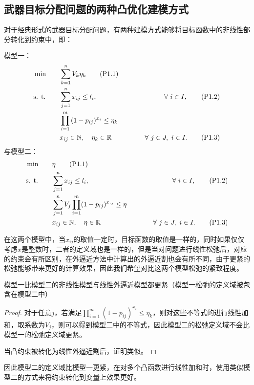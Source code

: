 \subsection{武器目标分配问题的两种凸优化建模方式}
对于经典形式的武器目标分配问题，有两种建模方式能够将目标函数中的非线性部分转化到约束中，即：

模型一：
\begin{alignat}{3}
    &\min\quad && \sum_{k=1}^n V_k \eta_k \tag{P1.1} \\ 
    &\text{s. t.}\quad &&\sum_{j=1}^n x_{ij} \leq l_i, \quad &\hspace{1cm}\forall ~ i \in I, \tag{P1.2}\\
    & &&  \prod_{i=1}^{m}{(1-p_{ij})^{x_{i}}} \leq \eta_k \\
    & && x_{ij} \in \mathbb{N},\quad \eta_k \in \mathbb{R} \quad &\hspace{1cm}\forall ~ j\in J, ~ i \in I. \tag{P1.3}
\end{alignat}
与模型二：
\begin{alignat}{3}
    &\min\quad && \eta \tag{P1.1} \\ 
    &\text{s. t.}\quad &&\sum_{j=1}^n x_{ij} \leq l_i, \quad &\hspace{1cm}\forall ~ i \in I, \tag{P1.2}\\
    & &&  \sum_{j=1}^n V_j \prod_{i=1}^m (1 - p_{ij}) ^ {x_{ij}} \leq \eta \\
    & && x_{ij} \in \mathbb{N},\quad \eta \in \mathbb{R} \quad &\hspace{1cm}\forall ~ j\in J, ~ i \in I. \tag{P1.3}
\end{alignat}

在这两个模型中，当$x_{ij}$的取值一定时，目标函数的取值是一样的，同时如果仅仅考虑$x$是整数时，二者的定义域也是一样的，但是当对问题进行线性松弛后，对应的约束会有所区别，在外逼近方法中计算出的外逼近割也会有所不同，由于更紧的松弛能够带来更好的计算效果，因此我们希望对比这两个模型松弛的紧致程度。

\begin{proposition}
    模型一比模型二的非线性模型与线性外逼近模型都更紧（模型一松弛的定义域被包含在模型二中）
\end{proposition}
\begin{proof}
    对于任意$j$，若满足$\prod_{i=1}^{m}{(1-p_{ij})^{x_{i}}} \leq \eta_k$，则对这些不等式的进行线性加和，取系数为$V_j$，则可以得到模型二中的不等式，因此模型二的松弛定义域不会比模型一的松弛定义域更紧。
    
    当凸约束被转化为线性外逼近割后，证明类似。
\end{proof}
因此模型二的定义域比模型一更紧，在对多个凸函数进行线性加和时，使用类似模型二的方式来将约束转化到变量上效果更好。

